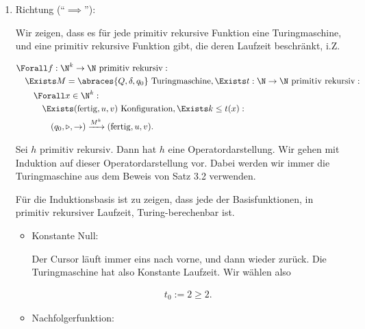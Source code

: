 \begin{solution}

\phantom{}

\begin{enumerate}[wide, labelindent = 0pt]

    \item Richtung (\enquote{$\implies$}):
    
    Wir zeigen, dass es für jede primitiv rekursive Funktion eine Turingmaschine, und eine primitiv rekursive Funktion gibt, die deren Laufzeit beschränkt, i.Z.

    \begin{align*}
        & \Forall f: \N^k \to \N ~\text{primitiv rekursiv}: \\
        & \quad \Exists M = \abraces{Q, \delta, q_0} ~\text{Turingmaschine},
                \Exists t: \N \to \N ~\text{primitiv rekursiv}: \\
        & \quad \quad \Forall x \in \N^k: \\
        & \quad \quad \quad \Exists (\mathrm{fertig}, u, v) ~\text{Konfiguration},
                            \Exists k \leq t(x): \\
        & \quad \quad \quad \quad (q_0, \triangleright, \rightarrow)
                                  \xrightarrow{M^k}
                                  (\mathrm{fertig}, u, v).
    \end{align*}

    Sei $h$ primitiv rekursiv.
    Dann hat $h$ eine Operatordarstellung.
    Wir gehen mit Induktion auf dieser Operatordarstellung vor.
    Dabei werden wir immer die Turingmaschine aus dem Beweis von Satz 3.2 verwenden.

    Für die Induktionsbasis ist zu zeigen, dass jede der Basisfunktionen, in primitiv rekursiver Laufzeit, Turing-berechenbar ist.

    \begin{itemize}

        \item Konstante Null:
        
        Der Cursor läuft immer eins nach vorne, und dann wieder zurück.
        Die Turingmaschine hat also Konstante Laufzeit.
        Wir wählen also

        \begin{align*}
            t_0
            :=
            2
            \geq
            2.
        \end{align*}

        \item Nachfolgerfunktion:
        

\end{itemize}
\end{enumerate}
\end{solution}
